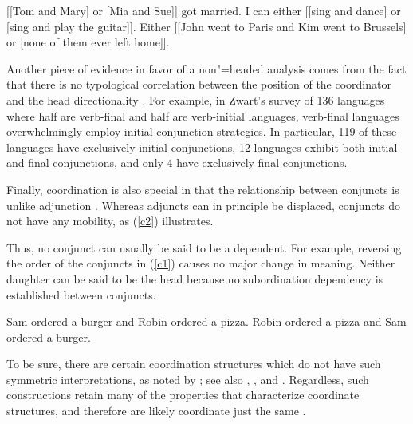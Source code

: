 \documentclass[output=paper
                ,modfonts
                ,nonflat
	        ,collection
	        ,collectionchapter
	        ,collectiontoclongg
 	        ,biblatex
                ,babelshorthands
                ,newtxmath
                ,draftmode
                ,colorlinks, citecolor=brown
]{./langsci/langscibook}
\begin{document}
{\begin{exe}
\ex
\begin{xlista}
\ex {}[[Tom and Mary] or [Mia and Sue]] got married.
\ex I can either [[sing and dance] or [sing and play the guitar]].
\ex Either [[John went to Paris and Kim went to Brussels] or
[none of them ever left home]].
\end{xlista}
\end{exe}

Another piece of evidence in favor of a non"=headed analysis comes from the fact that there is no typological correlation between the position of the coordinator and the head directionality \citep{zwart}. For example, in Zwart's  survey of 136 languages where half are verb-final and half
are verb-initial languages,  verb-final languages overwhelmingly employ initial conjunction strategies.
In particular, 119 of these languages have exclusively initial conjunctions, 12 languages exhibit both initial
and final conjunctions, and only 4 have exclusively final conjunctions. 


Finally, coordination is also special in that the relationship between conjuncts is unlike adjunction \citep{levinepostal}.\addpages
Whereas adjuncts can in principle be displaced, conjuncts do not have any mobility, as (\ref{c2}) illustrates.

\begin{exe}
\ex
\begin{xlista}
\end{xlista}\label{c2}
\end{exe}


\noindent
Thus, no conjunct can usually be said to be a dependent. For example,  reversing the order of the conjuncts in (\ref{c1}) causes no major change in meaning. Neither daughter can be said to be the head because no subordination dependency is established between conjuncts.

\begin{exe}
\ex
\begin{xlista}
\ex Sam ordered a burger and Robin ordered a pizza.
\ex Robin ordered a pizza and Sam ordered a burger.
\end{xlista}\label{c1}
\end{exe}

\noindent
To be sure, there are certain coordination structures which do not have such symmetric 
interpretations, as noted by \citet{ross67}; see also
\citet{goldsmith}, \citet{lakoff86}, and \citet{levinprince86}.
Regardless, such constructions retain many of the properties that characterize coordinate structures, and therefore are likely 
coordinate just the same \citep[Chapter~5]{kehler}.

}
\end{document}
